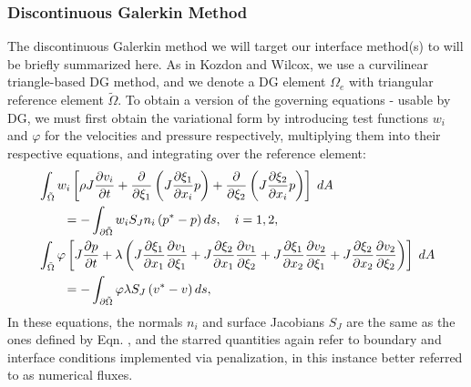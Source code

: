 \subsubsection{Discontinuous Galerkin Method}

The discontinuous Galerkin method we will target our interface method(s) to
will be briefly summarized here. As in Kozdon and Wilcox, we use a curvilinear
triangle-based DG method, and we denote a DG element $\Omega_e$ with triangular
reference element $\tilde{\Omega}$. To obtain a version of the governing equations
 -  usable by DG, we must first obtain the variational
form by introducing test functions $w_{i}$ and $\varphi$ for the velocities and pressure
respectively, multiplying them into their respective equations, and integrating over
the reference element:
\begin{align}
  \notag
  &\int_{\tilde{\Omega}} w_{i}\left[\rho J \frac{\partial v_{i}}{\partial t}
  + \frac{\partial}{\partial \xi_{1}}\left(J\frac{\partial \xi_{1}}{\partial x_{i}} p\right)
  + \frac{\partial}{\partial \xi_{2}}\left(J\frac{\partial \xi_{2}}{\partial x_{i}} p\right)\right]\;dA\\
  \label{eq:wave1_var}
  &\qquad=
  -\int_{\partial \tilde{\Omega}} w_{i} S_{J} n_{i} \left( p^* - p\right)ds,
  \quad i=1,2,\\
  \notag
  &\int_{\tilde{\Omega}}
  \varphi \left[J\frac{\partial p}{\partial t} + \lambda\left(
    J\frac{\partial \xi_{1}}{\partial x_{1}} \frac{\partial v_{1}}{\partial \xi_{1}}
  + J\frac{\partial \xi_{2}}{\partial x_{1}} \frac{\partial v_{1}}{\partial \xi_{2}}
  + J\frac{\partial \xi_{1}}{\partial x_{2}} \frac{\partial v_{2}}{\partial \xi_{1}}
  + J\frac{\partial \xi_{2}}{\partial x_{2}} \frac{\partial v_{2}}{\partial \xi_{2}}\right)\right]\;dA\\
  \label{eq:wave2_var}
  &\qquad=
  -\int_{\partial \tilde{\Omega}} \varphi\lambda S_{J}
  \left(v^*-v\right) ds,
\end{align}
In these equations, the normals $n_{i}$ and surface Jacobians $S_{J}$ are the same
as the ones defined by Eqn. , and the starred
quantities again refer to boundary and interface conditions implemented via penalization,
in this instance better referred to as numerical fluxes.
